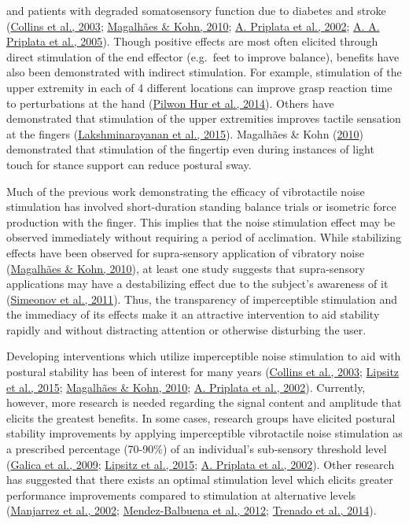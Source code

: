 \documentclass[]{cik}%
\begin{document}
and patients with degraded somatosensory function due to diabetes and
stroke (\protect\hyperlink{ref-Collins2003}{Collins et al., 2003};
\protect\hyperlink{ref-magalhuxe3es2011}{Magalhães \& Kohn, 2010};
\protect\hyperlink{ref-Priplata2002}{A. Priplata et al., 2002};
\protect\hyperlink{ref-Priplata2006}{A. A. Priplata et al., 2005}).
Though positive effects are most often elicited through direct
stimulation of the end effector (e.g.~feet to improve balance), benefits
have also been demonstrated with indirect stimulation. For example,
stimulation of the upper extremity in each of 4 different locations can
improve grasp reaction time to perturbations at the hand
(\protect\hyperlink{ref-Hur2014}{Pilwon Hur et al., 2014}). Others have
demonstrated that stimulation of the upper extremities improves tactile
sensation at the fingers
(\protect\hyperlink{ref-Lakshminarayanan2015}{Lakshminarayanan et al.,
2015}). Magalhães \& Kohn
(\protect\hyperlink{ref-magalhuxe3es2011}{2010}) demonstrated that
stimulation of the fingertip even during instances of light touch for
stance support can reduce postural sway.

Much of the previous work demonstrating the efficacy of vibrotactile
noise stimulation has involved short-duration standing balance trials or
isometric force production with the finger. This implies that the noise
stimulation effect may be observed immediately without requiring a
period of acclimation. While stabilizing effects have been observed for
supra-sensory application of vibratory noise
(\protect\hyperlink{ref-magalhuxe3es2011}{Magalhães \& Kohn, 2010}), at
least one study suggests that supra-sensory applications may have a
destabilizing effect due to the subject's awareness of it
(\protect\hyperlink{ref-Simeonov2011}{Simeonov et al., 2011}). Thus, the
transparency of imperceptible stimulation and the immediacy of its
effects make it an attractive intervention to aid stability rapidly and
without distracting attention or otherwise disturbing the user.

Developing interventions which utilize imperceptible noise stimulation
to aid with postural stability has been of interest for many years
(\protect\hyperlink{ref-Collins2003}{Collins et al., 2003};
\protect\hyperlink{ref-Lipsitz2015}{Lipsitz et al., 2015};
\protect\hyperlink{ref-magalhuxe3es2011}{Magalhães \& Kohn, 2010};
\protect\hyperlink{ref-Priplata2002}{A. Priplata et al., 2002}).
Currently, however, more research is needed regarding the signal content
and amplitude that elicits the greatest benefits. In some cases,
research groups have elicited postural stability improvements by
applying imperceptible vibrotactile noise stimulation as a prescribed
percentage (70-90\%) of an individual's sub-sensory threshold level
(\protect\hyperlink{ref-Galica2009}{Galica et al., 2009};
\protect\hyperlink{ref-Lipsitz2015}{Lipsitz et al., 2015};
\protect\hyperlink{ref-Priplata2002}{A. Priplata et al., 2002}). Other
research has suggested that there exists an optimal stimulation level
which elicits greater performance improvements compared to stimulation
at alternative levels (\protect\hyperlink{ref-Manjarrez2002}{Manjarrez
et al., 2002};
\protect\hyperlink{ref-Mendez-Balbuena2012}{Mendez-Balbuena et al.,
2012}; \protect\hyperlink{ref-Trenado2014}{Trenado et al., 2014}).
\end{document}
